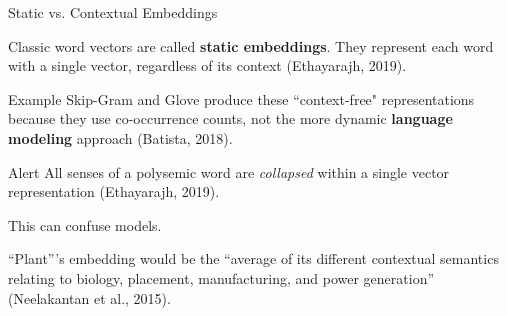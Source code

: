 \begin{frame}{Static vs. Contextual Embeddings}

\begin{itemizeSpaced}{5pt}
    \item Classic word vectors are called \textbf{static embeddings}. They represent each word with a single vector, regardless of its context (Ethayarajh, 2019). 
    
    
    
    \begin{exampleBlock}{Example}
        Skip-Gram and Glove produce these ``context-free" representations because they use co-occurrence counts, not the more dynamic \textbf{language modeling} approach (Batista, 2018). 
    \end{exampleBlock}
    
    \begin{alertBlock}{Alert}
        All senses of a polysemic word are \emph{collapsed} within a single vector representation (Ethayarajh, 2019). 
        
        This can confuse models.
        
        ``Plant”'s embedding would be the ``average of its different contextual semantics relating to biology, placement, manufacturing, and power generation” (Neelakantan et al., 2015).

    
    \end{alertBlock}
      
\end{itemizeSpaced}
    
\end{frame}




